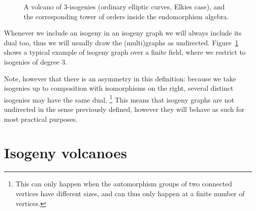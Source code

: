 \documentclass[10pt]{article}
\theoremstyle{plain}
\theoremstyle{definition}
\DeclareMathOperator{\End}{End} %
\def\O{\ensuremath{\mathcal{O}}}
\begin{document}
\begin{prposition}
\begin{figure}
  \centering
  
    \caption{A volcano of $3$-isogenies (ordinary elliptic curves,
      Elkies case), and the corresponding tower of orders inside the
      endomorphism algebra.}
  \label{fig:volcano}
\end{figure}

Whenever we include an isogeny in an isogeny graph we will always
include its dual too, thus we will usually draw the (multi)graphs as
undirected. %
Figure~\ref{fig:volcano} shows a typical example of isogeny graph over
a finite field, where we restrict to isogenies of degree $3$. %

Note, however that there is an asymmetry in this definition: because
we take isogenies up to composition with isomorphisms on the right,
several distinct isogenies may have the same dual.%
\footnote{This can only happen when the automorphism groups of two
  connected vertices have different sizes, and can thus only happen at
  a finite number of vertices.} %
This means that isogeny graphs are not undirected in the sense
previously defined, however they will behave as such for most
practical purposes. %


\section{Isogeny volcanoes}
\label{sec:ell-isogeny-graphs}


\end{prposition}
\end{document}
